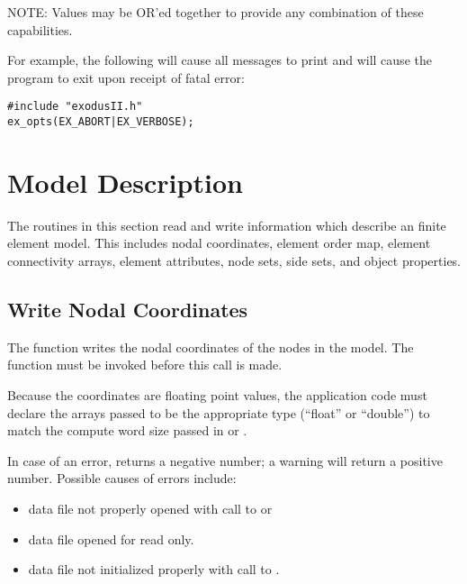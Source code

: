 NOTE: Values may be OR'ed together to provide any combination
of these capabilities.

For example, the following will cause all messages to print
and will cause the program to exit upon receipt of fatal error:

\begin{lstlisting}
#include "exodusII.h"
ex_opts(EX_ABORT|EX_VERBOSE);
\end{lstlisting}

\section{Model Description}

The routines in this section read and write information which
describe an \exo{} finite element model. This includes nodal
coordinates, element order map, element connectivity arrays,
element attributes, node sets, side sets, and object properties.

\subsection{Write Nodal Coordinates}

The function  writes the nodal coordinates of
the nodes in the model. The function  must be
invoked before this call is made.

Because the coordinates are floating point values, the application
code must declare the arrays passed to be the appropriate type
(``float'' or ``double'') to match the compute word size passed
in  or .

In case of an error,  returns a negative
number; a warning will return a positive number.
Possible causes of errors include:

\begin{itemize}
 \item data file not properly opened with call to 
 or 

 \item data file opened for read only.

 \item data file not initialized properly with call to
 .
\end{itemize}




